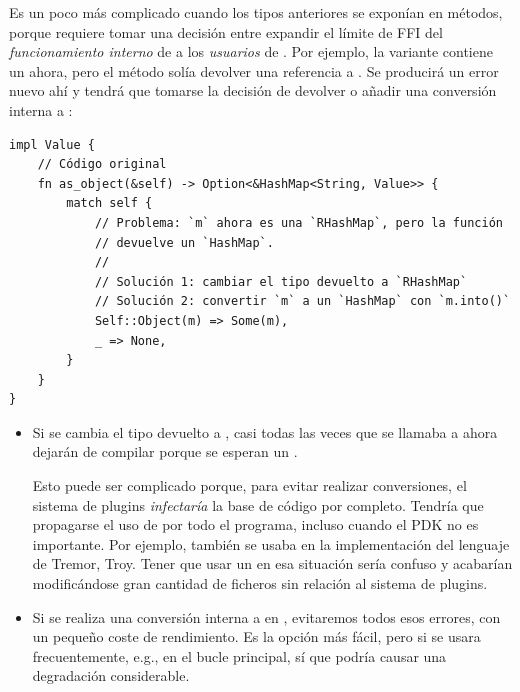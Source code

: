 Es un poco más complicado cuando los tipos anteriores se exponían en métodos,
porque requiere tomar una decisión entre expandir el límite de FFI del
\emph{funcionamiento interno} de  a los \emph{usuarios} de
. Por ejemplo, la variante  contiene un
 ahora, pero el método  solía devolver una
referencia a . Se producirá un error nuevo ahí y tendrá que
tomarse la decisión de devolver  o añadir una conversión interna
a :

\begin{verbatim}
impl Value {
    // Código original
    fn as_object(&self) -> Option<&HashMap<String, Value>> {
        match self {
            // Problema: `m` ahora es una `RHashMap`, pero la función
            // devuelve un `HashMap`.
            //
            // Solución 1: cambiar el tipo devuelto a `RHashMap`
            // Solución 2: convertir `m` a un `HashMap` con `m.into()`
            Self::Object(m) => Some(m),
            _ => None,
        }
    }
}
\end{verbatim}

\begin{itemize}
    \item Si se cambia el tipo devuelto a , casi todas las veces
        que se llamaba a  ahora dejarán de compilar porque se
        esperan un .

        Esto puede ser complicado porque, para evitar realizar conversiones, el
        sistema de plugins \emph{infectaría} la base de código por completo.
        Tendría que propagarse el uso de  por todo el programa,
        incluso cuando el PDK no es importante. Por ejemplo, 
        también se usaba en la implementación del lenguaje de Tremor, Troy.
        Tener que usar un  en esa situación sería confuso y
        acabarían modificándose gran cantidad de ficheros sin relación al
        sistema de plugins.

    \item Si se realiza una conversión interna a  en
        , evitaremos todos esos errores, con un pequeño coste de
        rendimiento. Es la opción más fácil, pero si  se
        usara frecuentemente, e.g., en el bucle principal, sí que podría causar
        una degradación considerable.
\end{itemize}

